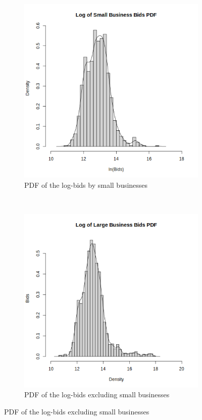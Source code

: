 \begin{figure}[ht!]
    \centering
    \begin{subfigure}{.5\textwidth}
      \centering
      \includegraphics[scale=0.5]{imgs/log-sb-pdf.png}
      \caption{PDF of the log-bids by small businesses}
    \end{subfigure}%
    ~ %
    \begin{subfigure}{.5\textwidth}
      \centering
      \includegraphics[scale=0.5]{imgs/log-lb-pdf.png}
      \caption{PDF of the log-bids excluding small businesses}
    \end{subfigure}%
    \label{fig:bid-pdfs}
\end{figure}

